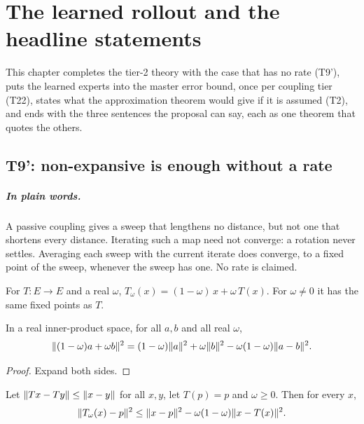 \chapter{The learned rollout and the headline statements}

This chapter completes the tier-2 theory with the case that has no rate (T9'),
puts the learned experts into the master error bound, once per coupling tier
(T22), states what the approximation theorem would give if it is assumed (T2),
and ends with the three sentences the proposal can say, each as one theorem
that quotes the others.

\section{T9': non-expansive is enough without a rate}

\paragraph{In plain words.}
A passive coupling gives a sweep that lengthens no distance, but not one that
shortens every distance.  Iterating such a map need not converge: a rotation
never settles.  Averaging each sweep with the current iterate does converge,
to a fixed point of the sweep, whenever the sweep has one.  No rate is claimed.

\begin{definition}\label{def:averaged}
  \leanok
  For $T:E\to E$ and a real $\omega$, $T_\omega(x)=(1-\omega)\,x+\omega\,T(x)$.
  For $\omega\ne0$ it has the same fixed points as $T$.
\end{definition}

\begin{lemma}\label{lem:T9p-identity}
  \leanok
  In a real inner-product space, for all $a,b$ and all real $\omega$,
  \[
    \lVert (1-\omega)a+\omega b\rVert^2
      =(1-\omega)\lVert a\rVert^2+\omega\lVert b\rVert^2-\omega(1-\omega)\lVert a-b\rVert^2 .
  \]
\end{lemma}

\begin{proof}
  \leanok
  Expand both sides.
\end{proof}

\begin{lemma}\label{lem:T9p-step}
  \leanok
  Let $\lVert Tx-Ty\rVert\le\lVert x-y\rVert$ for all $x,y$, let $T(p)=p$ and
  $\omega\ge0$.  Then for every $x$,
  \[
    \lVert T_\omega(x)-p\rVert^2\le\lVert x-p\rVert^2-\omega(1-\omega)\lVert x-T(x)\rVert^2 .
  \]
\end{lemma}

